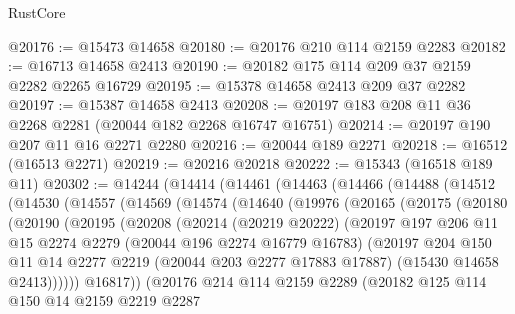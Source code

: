 \begin{lexlean}{RustCore}
\begin{coremodule}
@20176 := @15473 @14658
@20180 := @20176 @210 @114 @2159 @2283
@20182 := @16713 @14658 @2413
@20190 := @20182 @175 @114 @209 @37 @2159 @2282 @2265 @16729
@20195 := @15378 @14658 @2413 @209 @37 @2282
@20197 := @15387 @14658 @2413
@20208 := @20197 @183 @208 @11 @36 @2268 @2281 (@20044 @182 @2268 @16747 @16751)
@20214 := @20197 @190 @207 @11 @16 @2271 @2280
@20216 := @20044 @189 @2271
@20218 := @16512 (@16513 @2271)
@20219 := @20216 @20218
@20222 := @15343 (@16518 @189 @11)
@20302 := @14244
    (@14414
      (@14461
        (@14463
          (@14466
            (@14488
              (@14512
                (@14530
                  (@14557
                    (@14569
                      (@14574
                        (@14640
                          (@19976
                            (@20165
                              (@20175
                                (@20180
                                  (@20190
                                    (@20195
                                      (@20208
                                        (@20214
                                          (@20219 @20222)
                                          (@20197
                                            @197
                                            @206
                                            @11
                                            @15
                                            @2274
                                            @2279
                                            (@20044 @196 @2274 @16779 @16783)
                                            (@20197
                                              @204
                                              @150
                                              @11
                                              @14
                                              @2277
                                              @2219
                                              (@20044 @203 @2277 @17883 @17887)
                                              (@15430 @14658 @2413))))))
                                    @16817))
                                (@20176
                                  @214
                                  @114
                                  @2159
                                  @2289
                                  (@20182
                                    @125
                                    @114
                                    @150
                                    @14
                                    @2159
                                    @2219
                                    @2287

\end{coremodule}
\end{lexlean}
